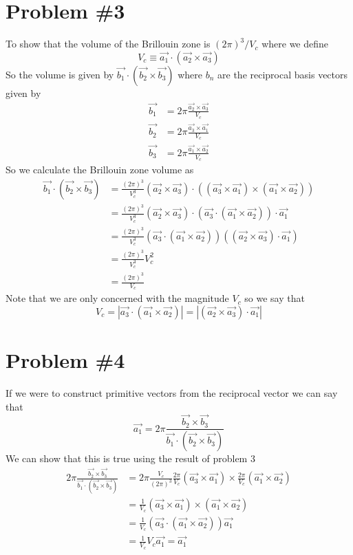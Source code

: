 \documentclass[11pt]{article}
\numberwithin{equation}{section}
\begin{document}
\section{Problem \#3}
To show that the volume of the Brillouin zone is $(2\pi)^3/V_c$ where we define
$$V_c\equiv \vec{a_1}\cdot(\vec{a_2}\times\vec{a_3})$$
So the volume is given by $\vec{b_1}\cdot(\vec{b_2}\times\vec{b_3})$ where $b_n$ are the reciprocal basis vectors given by
\begin{align*}
\vec{b_1} &= 2\pi\frac{\vec{a_2}\times\vec{a_3}}{V_c}\\
\vec{b_2} &= 2\pi\frac{\vec{a_3}\times\vec{a_1}}{V_c}\\
\vec{b_3} &= 2\pi\frac{\vec{a_1}\times\vec{a_2}}{V_c}
\end{align*}
So we calculate the Brillouin zone volume as
\begin{align*}
\vec{b_1}\cdot(\vec{b_2}\times\vec{b_3}) &= \frac{(2\pi)^3}{V_c^3}(\vec{a_2}\times\vec{a_3})\cdot((\vec{a_3}\times\vec{a_1})\times(\vec{a_1}\times\vec{a_2}))\\
&= \frac{(2\pi)^3}{V_c^3}(\vec{a_2}\times\vec{a_3})\cdot(\vec{a_3}\cdot(\vec{a_1}\times\vec{a_2}))\cdot\vec{a_1}\\
&= \frac{(2\pi)^3}{V_c^3}(\vec{a_3}\cdot(\vec{a_1}\times\vec{a_2}))((\vec{a_2}\times\vec{a_3})\cdot\vec{a_1})\\
&= \frac{(2\pi)^3}{V_c^3}V_c^2\\
&= \frac{(2\pi)^3}{V_c}
\end{align*}
Note that we are only concerned with the magnitude $V_c$ so we say that
$$V_c = |\vec{a_3}\cdot(\vec{a_1}\times\vec{a_2})| = |(\vec{a_2}\times\vec{a_3})\cdot\vec{a_1}|$$

\section{Problem \#4}
If we were to construct primitive vectors from the reciprocal vector we can say that
$$\vec{a_1} = 2\pi\frac{\vec{b_2}\times\vec{b_3}}{\vec{b_1}\cdot(\vec{b_2}\times\vec{b_3})}$$
We can show that this is true using the result of problem 3
\begin{align*}
2\pi\frac{\vec{b_2}\times\vec{b_3}}{\vec{b_1}\cdot(\vec{b_2}\times\vec{b_3})} &=2\pi\frac{V_c}{(2\pi)^3}\frac{2\pi}{V_c}(\vec{a_3}\times\vec{a_1})\times\frac{2\pi}{V_c}(\vec{a_1}\times\vec{a_2}) \\
&=\frac{1}{V_c}(\vec{a_3}\times\vec{a_1})\times(\vec{a_1}\times\vec{a_2}) \\
&=\frac{1}{V_c}(\vec{a_3}\cdot(\vec{a_1}\times\vec{a_2}))\vec{a_1} \\
&=\frac{1}{V_c}V_c\vec{a_1} = \vec{a_1}
\end{align*}
\end{document}
